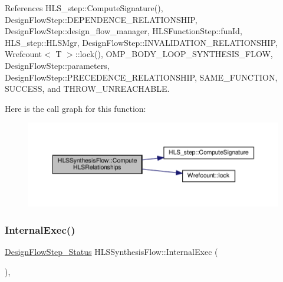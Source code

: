 References H\+L\+S\+\_\+step\+::\+Compute\+Signature(), Design\+Flow\+Step\+::\+D\+E\+P\+E\+N\+D\+E\+N\+C\+E\+\_\+\+R\+E\+L\+A\+T\+I\+O\+N\+S\+H\+IP, Design\+Flow\+Step\+::design\+\_\+flow\+\_\+manager, H\+L\+S\+Function\+Step\+::fun\+Id, H\+L\+S\+\_\+step\+::\+H\+L\+S\+Mgr, Design\+Flow\+Step\+::\+I\+N\+V\+A\+L\+I\+D\+A\+T\+I\+O\+N\+\_\+\+R\+E\+L\+A\+T\+I\+O\+N\+S\+H\+IP, Wrefcount$<$ T $>$\+::lock(), O\+M\+P\+\_\+\+B\+O\+D\+Y\+\_\+\+L\+O\+O\+P\+\_\+\+S\+Y\+N\+T\+H\+E\+S\+I\+S\+\_\+\+F\+L\+OW, Design\+Flow\+Step\+::parameters, Design\+Flow\+Step\+::\+P\+R\+E\+C\+E\+D\+E\+N\+C\+E\+\_\+\+R\+E\+L\+A\+T\+I\+O\+N\+S\+H\+IP, S\+A\+M\+E\+\_\+\+F\+U\+N\+C\+T\+I\+ON, S\+U\+C\+C\+E\+SS, and T\+H\+R\+O\+W\+\_\+\+U\+N\+R\+E\+A\+C\+H\+A\+B\+LE.

Here is the call graph for this function\+:
\nopagebreak
\begin{figure}[H]
\begin{center}
\leavevmode
\includegraphics[width=350pt]{dc/d92/classHLSSynthesisFlow_ab50e0c7e5ddf4bc0e977f2fb2d1b3d21_cgraph}
\end{center}
\end{figure}
\mbox{\label{classHLSSynthesisFlow_acb5919ff1945e5bf341f9df0d301538b}} 
\subsubsection{\texorpdfstring{Internal\+Exec()}{InternalExec()}}
{\footnotesize\ttfamily \hyperlink{design__flow__step_8hpp_afb1f0d73069c26076b8d31dbc8ebecdf}{Design\+Flow\+Step\+\_\+\+Status} H\+L\+S\+Synthesis\+Flow\+::\+Internal\+Exec (\begin{DoxyParamCaption}{ }\end{DoxyParamCaption})\hspace{0.3cm}{\ttfamily [override]}, {\ttfamily [virtual]}}



